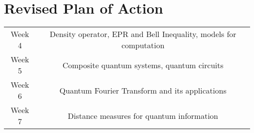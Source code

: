 \section{Revised Plan of Action}
\begin{center}
\begin{tabular}{c|c}
    Week 4 & Density operator, EPR and Bell Inequality, models for computation \\
    Week 5 & Composite quantum systems, quantum circuits \\
    Week 6 & Quantum Fourier Transform and its applications \\
    Week 7 & Distance measures for quantum information
\end{tabular}
\end{center}